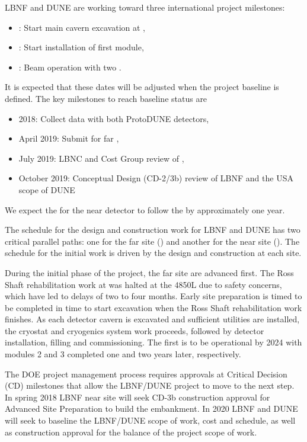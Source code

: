 LBNF and DUNE are working toward three international project milestones:
\begin{itemize}
\item \maincavernstartexc{}: Start main cavern excavation at \surf{},
\item \firstfdmodstartinstall{}: Start installation of first  module,
\item \beamturnon{}: Beam operation with two .
\end{itemize}
It is expected that these dates will be adjusted when the project baseline is defined. The key milestones to reach baseline status are
\begin{itemize}
\item 2018: Collect data with both ProtoDUNE detectors,
\item April 2019: Submit  for far ,
\item July 2019: LBNC and Cost Group review of ,
\item October 2019: Conceptual Design (CD-2/3b) review of LBNF and the USA scope of DUNE
\end{itemize}
We expect the  for the near detector to follow the   by approximately one year.

The schedule for the design and construction work for LBNF and DUNE has two critical parallel paths: one for the %
far site (\surf) and %
another for the %
near site (\fnal). The schedule for the initial work is driven by the  design and construction at each site.

During the initial phase of the project, the far site  are advanced first. The Ross Shaft rehabilitation
work at \surf was halted at the 4850L due to safety concerns, which have led to delays of two to four months. Early site preparation is timed to be completed 
in time to start excavation when the Ross Shaft rehabilitation work finishes. As each detector 
 cavern is excavated and sufficient utilities are installed, the cryostat and cryogenics system work proceeds, followed by detector installation, filling and commissioning. 
The first  is to be operational by 2024 with modules 2 and 3 completed
one and two years later, respectively.

The DOE project management process requires approvals at Critical Decision (CD) milestones that allow the LBNF/DUNE project to move to the next step. In spring 2018 LBNF near site  will seek CD-3b construction approval for Advanced Site Preparation to build the embankment. In 2020 LBNF and DUNE will seek to baseline the LBNF/DUNE scope of work, cost and schedule, as well as construction approval for the balance of the project scope of work. 

